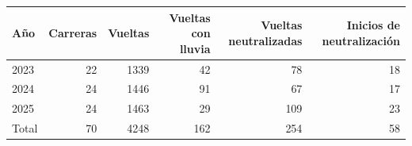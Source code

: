\begin{tabular}{lrrrrr}
\toprule
Año & Carreras & Vueltas & Vueltas con lluvia & Vueltas neutralizadas & Inicios de neutralización \\
\midrule
2023 & 22 & 1339 & 42 & 78 & 18 \\
2024 & 24 & 1446 & 91 & 67 & 17 \\
2025 & 24 & 1463 & 29 & 109 & 23 \\
\midrule
Total & 70 & 4248 & 162 & 254 & 58 \\
\bottomrule
\end{tabular}